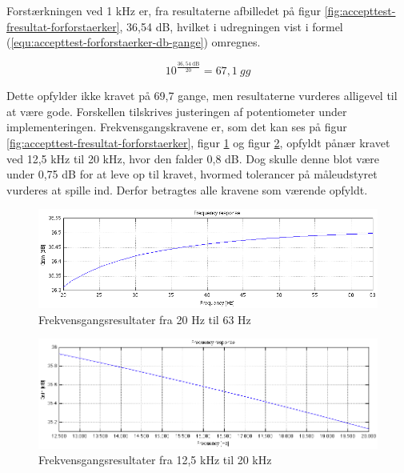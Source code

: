 Forstærkningen ved 1 kHz er, fra resultaterne afbilledet på figur \ref{fig:accepttest-fresultat-forforstaerker}, 36,54 dB, hvilket i udregningen vist i formel (\ref{equ:accepttest-forforstaerker-db-gange}) omregnes.

\begin{equation}
\label{equ:accepttest-forforstaerker-db-gange}
10^{\frac{\mathrm{36,54~dB}}{20}} = 67,1~gg
\end{equation}

Dette opfylder ikke kravet på 69,7 gange, men resultaterne vurderes alligevel til at være gode. Forskellen tilskrives justeringen af potentiometer under implementeringen. Frekvensgangskravene er, som det kan ses på figur \ref{fig:accepttest-fresultat-forforstaerker}, figur \ref{fig:accepttest-fres-20-63} og figur \ref{fig:accepttest-fres-125-20}, opfyldt pånær kravet ved 12,5 kHz til 20 kHz, hvor den falder 0,8 dB. Dog skulle denne blot være under 0,75 dB for at leve op til kravet, hvormed tolerancer på måleudstyret vurderes at spille ind. Derfor betragtes alle kravene som værende opfyldt.

\begin{figure}[h]
\centering
\includegraphics[width=\textwidth]{maalerapporter/forforstaerker/fr20-63.png}
\caption{Frekvensgangsresultater fra 20 Hz til 63 Hz}
\label{fig:accepttest-fres-20-63}
\end{figure}

\begin{figure}[h]
\centering
\includegraphics[width=\textwidth]{maalerapporter/forforstaerker/fr12-20k.png}
\caption{Frekvensgangsresultater fra 12,5 kHz til 20 kHz}
\label{fig:accepttest-fres-125-20}
\end{figure}